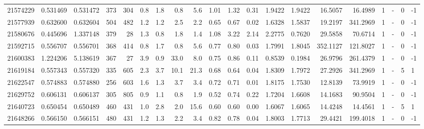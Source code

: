 \begin{tabular}{rrrrrrrrrrrrrrrrrlrl}
  21574229 & 0.531469 &   0.531472 &  373 &  304 &      0.8 &      1.8 &     0.8 &      5.6 &       1.01 &        1.32 &        0.31 &  1.9422 &  1.9422 &   16.5057 &   16.4989 &       1 &             - &        0 &        -1 \\
  21577939 & 0.632600 &   0.632604 &  504 &  482 &      1.2 &      1.2 &     2.5 &      2.2 &       0.65 &        0.67 &        0.02 &  1.6328 &  1.5837 &   19.2197 &  341.2969 &       1 &             - &        0 &        -1 \\
  21580676 & 0.445696 &   1.337148 &  379 &   28 &      1.3 &      0.8 &     1.8 &      1.4 &       1.08 &        3.22 &        2.14 &  2.2775 &  0.7620 &   29.5858 &   70.6714 &       1 &             - &        0 &        -1 \\
  21592715 & 0.556707 &   0.556701 &  368 &  414 &      0.8 &      1.7 &     0.8 &      5.6 &       0.77 &        0.80 &        0.03 &  1.7991 &  1.8045 &  352.1127 &  121.8027 &       1 &             - &        0 &        -1 \\
  21600383 & 1.224206 &   5.138619 &  367 &   27 &      3.9 &      0.9 &    33.0 &      8.0 &       0.75 &        0.86 &        0.11 &  0.8539 &  0.1984 &   26.9796 &  261.4379 &       1 &             - &        0 &        -1 \\
  21619184 & 0.557343 &   0.557320 &  335 &  605 &      2.3 &      3.7 &    10.1 &     21.3 &       0.68 &        0.64 &        0.04 &  1.8309 &  1.7972 &   27.2926 &  341.2969 &       1 &             - &        5 &         1 \\
  21622547 & 0.574883 &   0.574880 &  256 &  603 &      1.6 &      1.3 &     3.7 &      3.4 &       0.72 &        0.71 &        0.01 &  1.8175 &  1.7530 &   12.8139 &   73.9919 &       1 &             - &        0 &        -1 \\
  21629752 & 0.606131 &   0.606137 &  305 &  805 &      0.9 &      1.1 &     0.8 &      1.9 &       0.52 &        0.74 &        0.22 &  1.7204 &  1.6608 &   14.1683 &   90.9504 &       1 &             - &        0 &        -1 \\
  21640723 & 0.650454 &   0.650489 &  460 &  431 &      1.0 &      2.8 &     2.0 &     15.6 &       0.60 &        0.60 &        0.00 &  1.6067 &  1.6065 &   14.4248 &   14.4561 &       1 &             - &        5 &         1 \\
  21648266 & 0.566150 &   0.566151 &  480 &  431 &      1.2 &      1.3 &     2.2 &      3.4 &       0.82 &        0.78 &        0.04 &  1.8003 &  1.7713 &   29.4421 &  199.4018 &       1 &             - &        0 &        -1 \\

\end{tabular}

